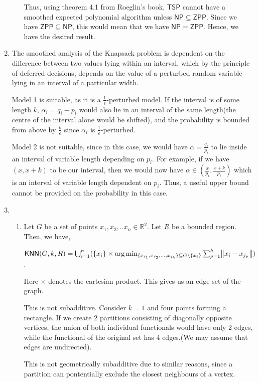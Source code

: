 \documentclass{article}
\newcommand{\lang}[1]{\mathsf{#1}}
\newcommand{\cc}[1]{\mathsf{#1}}
\begin{document}
\begin{enumerate}
\begin{enumerate}
			 Thus, using theorem 4.1 from Roeglin's book, $\lang{TSP}$ cannot have a smoothed expected polynomial algorithm unless $\cc{NP} \subseteq \cc{ZPP}$. Since we have $\cc{ZPP} \subseteq \cc{NP}$, this would mean that we have $\cc{NP} = \cc{ZPP}$. Hence, we have the desired result.  
		\end{enumerate}
	\item The smoothed analysis of the Knapsack problem is dependent on the difference between two values lying within an interval, which by the principle of deferred decisions, depends on the value of a perturbed random variable lying in an interval of a particular width. 
	
	Model 1 is suitable, as it is a $\frac{1}{\epsilon}$-perturbed model. If the interval is of some length $k$,  $\alpha_i = q_i - p_i$ would also lie in an interval of the same length(the centre of the interval alone would be shifted), and the probability is bounded from above by $\frac{k}{\epsilon}$ since $\alpha_i$ is $\frac{1}{\epsilon}$-perturbed. 
	
	Model 2 is not suitable, since in this case, we would have $\alpha = \frac{q_i}{p_i}$ to lie inside an interval of variable length depending on $p_i$. For example, if we have $(x,x+k)$ to be our interval, then we would now have $\alpha \in (\frac{x}{p_i},\frac{x+k}{p_i})$ which is an interval of variable length dependent on $p_i$.
 	Thus, a useful upper bound cannot be provided on the probability in this case.  
	\item \begin{enumerate}
		\item Let $G$ be a set of points $x_1,x_2,..x_n \in \mathbb{R}^2$. Let $R$ be a bounded region. Then, we have,
		
		$\lang{KNN}(G,k,R) = \bigcup_{i=1}^{n}( \{x_i\} \times \arg\min_{\{x_{j_1},x_{j_2},\ldots,x_{j_k}\} \subseteq G\setminus\{x_i\}} \sum_{p=1}^{k} \norm{x_i - x_{j_p}})$.
		
		Here $\times$ denotes the cartesian product. 
		This gives us an edge set of the graph. 
		
		This is not subadditive. Consider $k=1$ and four points forming a rectangle. If we create 2 partitions consisting of diagonally opposite vertices, the union of both individual functionals would have only 2 edges, while the functional of the original set has 4 edges.(We may assume that edges are undirected).
		
		This is not geometrically subadditive due to similar reasons, since a partition can pontentially exclude the closest neighbours of a vertex.  
		

\end{enumerate}
\end{enumerate}
\end{document}

